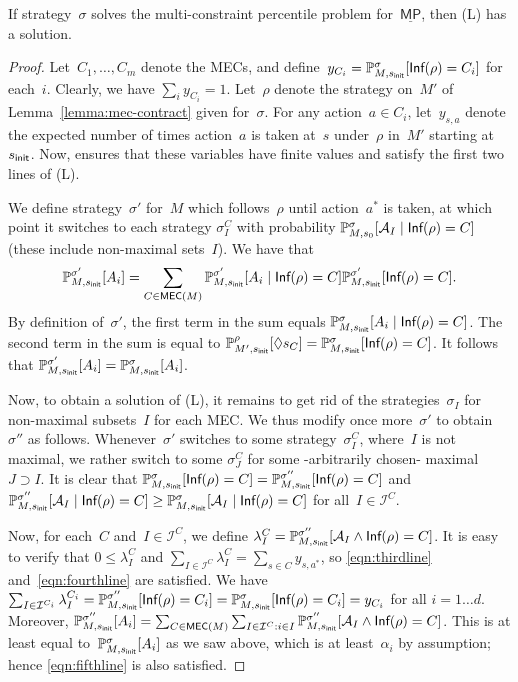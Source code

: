 \documentclass{llncs}
\newcommand{\initState}{\ensuremath{s_{{\sf init}}} }
\newcommand*{\pr}{\mathbb{P}}
\newcommand*{\mpinf}{\ensuremath{\underline{\mathsf{MP}}}}
\newcommand{\Inf}{\textrm{\sf Inf}}
\newcommand\calI{\ensuremath{\mathcal{I}}}
\newcommand\calA{\ensuremath{\mathcal{A}}}
\newcommand\mecs{\ensuremath{\textrm{\sf MEC}}}
\begin{document}
\begin{lemma}
  If strategy~$\sigma$ solves the multi-constraint percentile problem for~$\mpinf$, then (L) has a solution.
\end{lemma}
\begin{proof}
  Let~$C_1,\ldots,C_m$ denote the MECs,
  and define~$y_{C_i} = \pr_{M,\initState}^\sigma[\Inf(\rho) = C_i]$ for each~$i$.
  Clearly, we have $\sum_i y_{C_i} = 1$.
  Let~$\rho$ denote the strategy on~$M'$ of Lemma~\ref{lemma:mec-contract} given for~$\sigma$.
  For any action~$a \in C_i$, let~$y_{s,a}$ denote the expected number of times action~$a$ is taken at~$s$ under~$\rho$
  in~$M'$ starting at~$\initState$. 
  Now, \cite[Lemma 3.3]{EKVY-lmcs08} ensures that these variables have finite values and satisfy the 
  first two lines of (L).

  We define strategy~$\sigma'$ for~$M$ which follows~$\rho$ until action~$a^*$ is taken, at which point
  it switches to each strategy $\sigma_I^C$ with probability $\pr_{M,s_0}^{\sigma}[\calA_I\mid \Inf(\rho) = C]$	(these include non-maximal sets~$I$).
  We have that 
  \[
  \pr_{M,\initState}^{\sigma'}[A_i] = \sum_{C \in \mecs(M)} \pr_{M,\initState}^{\sigma'}[A_i \mid \Inf(\rho) = C]\pr_{M,\initState}^{\sigma'}[\Inf(\rho) = C].
  \]
  By definition of~$\sigma'$, the first term in the sum equals
  ${\pr_{M,\initState}^\sigma[A_i\mid \Inf(\rho) = C]}$.
  The second term in the sum is equal to $\pr_{M',\initState}^\rho[\Diamond s_{C}]=
  \pr_{M,\initState}^\sigma[\Inf(\rho) = C]$. 
  It follows that $\pr_{M,\initState}^{\sigma'}[A_i] = \pr_{M,\initState}^{\sigma}[A_i]$.

  Now, to obtain a solution of (L), it remains to get rid of the strategies~$\sigma_I$ for non-maximal subsets~$I$ for each MEC.
  We thus modify once more~$\sigma'$ to obtain~$\sigma''$ as follows. Whenever~$\sigma'$ switches to some strategy~$\sigma_I^C$,
  where~$I$ is not maximal, we rather switch to some $\sigma_J^C$ for some -arbitrarily chosen- maximal~$J\supset I$.
  It is clear that $\pr_{M,\initState}^\sigma[\Inf(\rho)=C] = \pr_{M,\initState}^{\sigma''}[\Inf(\rho) = C]$ and
  $\pr_{M,\initState}^{\sigma''}[\calA_I \mid \Inf(\rho) = C]\geq \pr_{M,\initState}^{\sigma}[\calA_I \mid \Inf(\rho)=C]$ for all~$I \in \calI^C$.
  
  Now, for each~$C$ and~$I \in \calI^C$, we define $\lambda_I^C = \pr_{M,\initState}^{\sigma''}[\calA_I \land \Inf(\rho) = C]$.
  It is easy to verify that $0\leq \lambda_I^C$ and $\sum_{I \in \calI^C} \lambda_I^C = \sum_{s \in C}y_{s,a^*}$, so \eqref{eqn:thirdline} and~\eqref{eqn:fourthline} are satisfied.
  We have $\sum_{I \in \calI^{C_i}} \lambda_I^{C_i} = \pr_{M,\initState}^{\sigma''}[\Inf(\rho)=C_i] = \pr_{M,\initState}^\sigma[\Inf(\rho) = C_i] =  y_{C_i}$
  for all $i=1\ldots d$. Moreover, $\pr_{M,\initState}^{\sigma''}[A_i] = \sum_{C \in \mecs(M)}\sum_{I \in \calI^C: i \in I} \pr_{M,\initState}^{\sigma''}[\calA_I \land \Inf(\rho)= C]$.
  This is at least equal to~$\pr_{M,\initState}^{\sigma}[A_i]$ as we saw above, which is at least~$\alpha_i$ by assumption; hence \eqref{eqn:fifthline} is also satisfied.
\end{proof}
\end{document}
